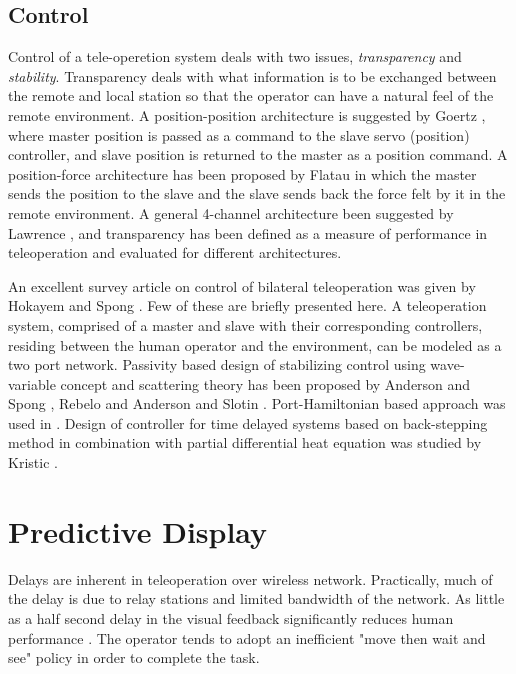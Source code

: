 \subsection{Control}
Control of a tele-operetion system deals with two issues, \textit{transparency} and \textit{stability}. Transparency deals with what information is to be exchanged between the remote and local station so that the operator can have a natural feel of the remote environment. A position-position architecture is suggested by  Goertz \cite{goertz1961anl}, where  master position is passed as a command to the slave servo (position) controller, and slave position is returned to the master as a position command. A position-force architecture has been proposed by Flatau \cite{flatau1977sm} in which the master sends the position to the slave and the slave sends back the force felt by it in the remote environment. A general 4-channel architecture been suggested by Lawrence \cite{lawrence1993stability}, and transparency has been defined  as a measure of performance in teleoperation and evaluated for different architectures.
 
An excellent survey article on control of bilateral teleoperation was given by Hokayem and Spong \cite{hokayem2006bilateral}. Few of these are briefly presented here. A teleoperation system, comprised of a master and slave with their corresponding controllers, residing between the human operator and the environment,   can be modeled as a two port network. Passivity based design of stabilizing control using  wave-variable concept and scattering theory has been proposed by Anderson and Spong \cite{anderson1989bilateral}, Rebelo \cite{rebelo2015time} and Anderson and Slotin \cite{niemeyer1991stable}.   Port-Hamiltonian  based approach was used in \cite{stramigioli2010novel,stramigioli2005sampled}. Design of controller for time delayed systems  based on back-stepping method in combination with partial differential heat  equation was studied by  Kristic \cite{krstic2009delay}. 



\section{Predictive Display}
Delays are inherent in teleoperation over wireless network. Practically, much of the delay is due to relay stations and limited  bandwidth of the network.  As little as a half second delay in the visual feedback significantly reduces human performance \cite{chen2007human}. The operator tends to adopt an inefficient "move then wait and see" policy in order to complete the task.

